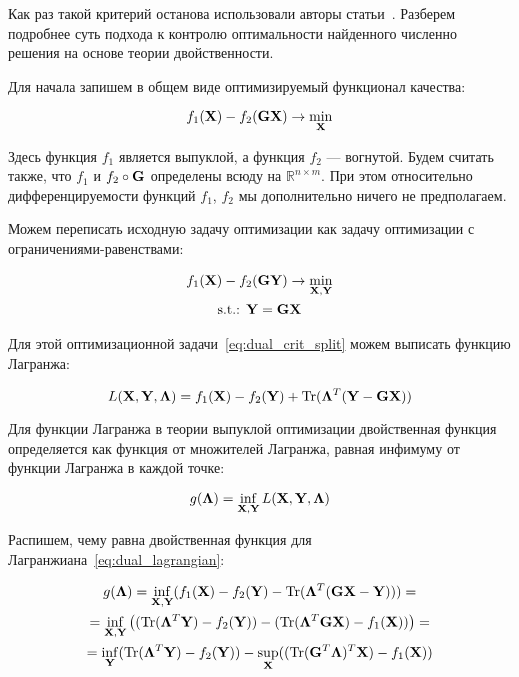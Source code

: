 Как раз такой критерий останова использовали авторы статьи~\cite{gramfort_2012}.
Разберем подробнее суть подхода к контролю оптимальности найденного численно
решения на основе теории двойственности.

Для начала запишем в общем виде оптимизируемый функционал качества:

\begin{equation}
    f_1(\mathbf{X}) - f_2(\mathbf{G}\mathbf{X}) \rightarrow \min_{\mathbf{X}}
    \label{eq:dual_init_crit}
\end{equation}

Здесь функция $f_1$ является выпуклой, а функция $f_2$ --- вогнутой. Будем считать
также, что $f_1$ и $f_2\circ\mathbf{G}$ определены всюду на $\mathbb{R}^{n\times m}$.
При этом относительно дифференцируемости функций $f_1$, $f_2$ мы дополнительно
ничего не предполагаем.

Можем переписать исходную задачу оптимизации как задачу оптимизации с
ограничениями-равенствами:

\begin{equation}
    \begin{gathered}
        f_1(\mathbf{X}) - f_2(\mathbf{G}\mathbf{Y}) \rightarrow \min_{\mathbf{X},\mathbf{Y}}\\
        \text{s.t.: } \mathbf{Y} = \mathbf{G}\mathbf{X}
    \end{gathered}
    \label{eq:dual_crit_split}
\end{equation}


Для этой оптимизационной задачи~\ref{eq:dual_crit_split} можем выписать функцию Лагранжа:

\begin{equation}
    L(\mathbf{X}, \mathbf{Y}, \mathbf{\Lambda}) = f_1(\mathbf{X}) - f_2(\mathbf{Y}) + \operatorname*{Tr}(\mathbf{\Lambda}^T(\mathbf{Y} - \mathbf{G}\mathbf{X}))
    \label{eq:dual_lagrangian}
\end{equation}

Для функции Лагранжа в теории выпуклой оптимизации двойственная
функция определяется как функция от множителей Лагранжа,
равная инфимуму от функции Лагранжа в каждой точке:

\begin{equation}
    g(\mathbf{\Lambda}) = \inf_{\mathbf{X}, \mathbf{Y}} L(\mathbf{X}, \mathbf{Y}, \mathbf{\Lambda})
    \label{eq:dual_dual_func_def}
\end{equation}

Распишем, чему равна двойственная функция для Лагранжиана~\ref{eq:dual_lagrangian}:

\begin{multline}
    g(\mathbf{\Lambda}) = \inf_{\mathbf{X}, \mathbf{Y}} (f_1(\mathbf{X}) - f_2(\mathbf{Y}) - \operatorname*{Tr}(\mathbf{\Lambda}^T(\mathbf{G}\mathbf{X} - \mathbf{Y}))) =\\
    = \inf_{\mathbf{X}, \mathbf{Y}} \left( (\operatorname*{Tr}(\mathbf{\Lambda}^T \mathbf{Y}) - f_2(\mathbf{Y})) - (\operatorname*{Tr}(\mathbf{\Lambda}^T \mathbf{G}\mathbf{X}) - f_1(\mathbf{X}))\right) =\\
    = \inf_{\mathbf{Y}}(\operatorname*{Tr}(\mathbf{\Lambda}^T \mathbf{Y}) - f_2(\mathbf{Y})) - \sup_{\mathbf{X}}((\operatorname*{Tr}(\mathbf{G}^T\mathbf{\Lambda})^T \mathbf{X}) - f_1(\mathbf{X}))
    \label{eq:dual_derive_lagrangian}
\end{multline}

